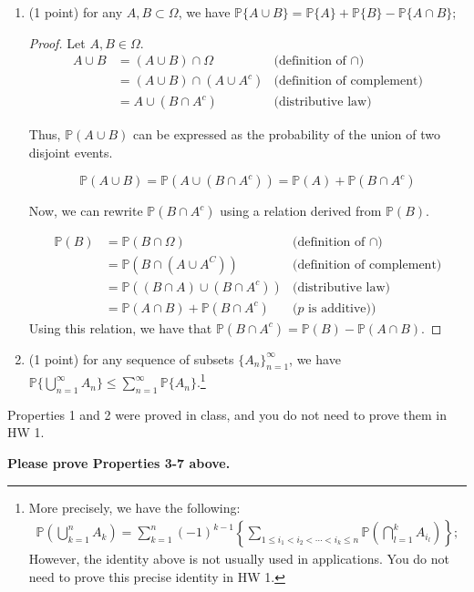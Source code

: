\documentclass[11pt]{article}
\newcommand{\p}{\mathbb{P}}
\begin{document}
\begin{enumerate}
\item (1 point) for any $A,B\subset\Omega$, we have $\mathbb{P}\{A\cup B\}=\mathbb{P}\{A\}+\mathbb{P}\{B\}-\mathbb{P}\{A\cap B\}$;
\begin{proof}
  Let \(A,B\in\Omega\). 
  \begin{align*}
    A\cup B &= (A\cup B)\cap \Omega & \text{(definition of \(\cap\))}\\
    &= (A\cup B) \cap (A\cup A^c) & \text{(definition of complement)}\\
    &= A\cup (B\cap A^c) & \text{(distributive law)}
  \end{align*}

  Thus, \(\p(A\cup B)\) can be expressed as the probability of the union of two disjoint events.

  \[\p(A\cup B) = \p(A\cup (B\cap A^c)) = \p(A) + \p(B\cap A^c)\]

  Now, we can rewrite \(\p(B\cap A^c)\) using a relation derived from \(\p(B)\).

  \begin{align*}
    \p(B) &= \p(B\cap \Omega) & \text{(definition of \(\cap\))}\\
    &= \p(B\cap (A\cup A^C)) & \text{(definition of complement)}\\
    &= \p((B\cap A)\cup (B\cap A^c)) & \text{(distributive law)}\\
    &= \p(A\cap B) + \p(B\cap A^c) & \text{(\(p\) is additive))}
  \end{align*}
  Using this relation, we have that \(\p(B\cap A^c)=\p(B)-\p(A\cap B)\).
\end{proof}

\item (1 point) for any sequence of subsets $\{A_n\}_{n=1}^\infty$, we have $\mathbb{P}\{\bigcup_{n=1}^\infty A_n\}\le\sum_{n=1}^\infty\mathbb{P}\{A_n\}$.\footnote{More precisely, we have the following: 
    \begin{align*}
      \mathbb{P}\left(\bigcup_{k=1}^n A_k\right)=\sum_{k=1}^n(-1)^{k-1}\left\{\sum_{1\le i_1<i_2<\cdots<i_k\le n} \mathbb{P}\left(\bigcap_{l=1}^k A_{i_l}\right)\right\};  
    \end{align*}
    However, the identity above is not usually used in applications. You do not need to prove this precise identity in HW 1.}
\end{enumerate}

Properties 1 and 2 were proved in class, and you do not need to prove them in HW 1. 

\textbf{Please prove Properties 3-7 above. }
\end{document}
